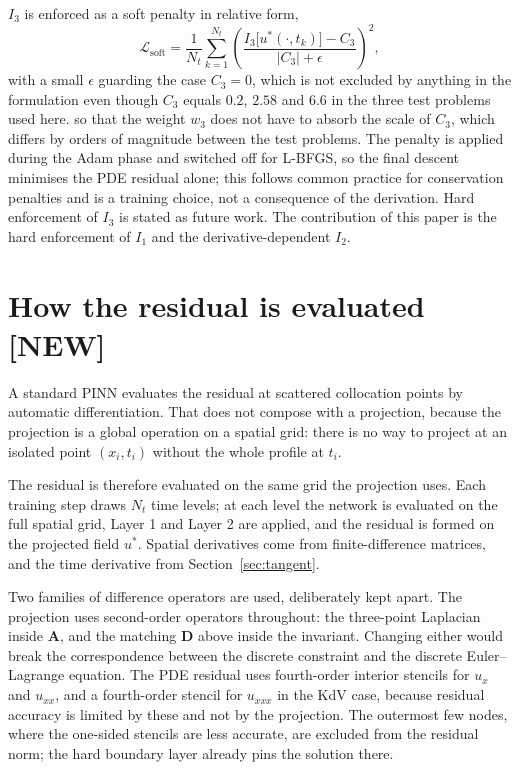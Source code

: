 \documentclass[11pt,a4paper]{article}
\theoremstyle{remark}
\newcommand{\us}{u^{*}}
\begin{document}
$I_3$ is enforced as a soft penalty in relative form,
\begin{equation}
\mathcal{L}_{\text{soft}} = \frac{1}{N_t}\sum_{k=1}^{N_t}
\left(\frac{I_3\big[\us(\cdot,t_k)\big] - C_3}{|C_3| + \epsilon}\right)^{\!2} ,
\end{equation}
with a small $\epsilon$ guarding the case $C_3 = 0$, which is not excluded by
anything in the formulation even though $C_3$ equals $0.2$, $2.58$ and $6.6$ in
the three test problems used here.
so that the weight $w_3$ does not have to absorb the scale of $C_3$, which
differs by orders of magnitude between the test problems. The penalty is
applied during the Adam phase and switched off for L-BFGS, so the final
descent minimises the PDE residual alone; this follows common practice for
conservation penalties and is a training choice, not a consequence of the
derivation. Hard enforcement of $I_3$ is stated as future work. The contribution of this
paper is the hard enforcement of $I_1$ and the derivative-dependent $I_2$.

\section{How the residual is evaluated \textbf{[NEW]}}

A standard PINN evaluates the residual at scattered collocation points by
automatic differentiation. That does not compose with a projection, because
the projection is a global operation on a spatial grid: there is no way to
project at an isolated point $(x_i,t_i)$ without the whole profile at $t_i$.

The residual is therefore evaluated on the same grid the projection uses. Each
training step draws $N_t$ time levels; at each level the network is evaluated
on the full spatial grid, Layer 1 and Layer 2 are applied, and the residual is
formed on the projected field $\us$. Spatial derivatives come from
finite-difference matrices, and the time derivative from
Section~\ref{sec:tangent}.

Two families of difference operators are used, deliberately kept apart. The
projection uses second-order operators throughout: the three-point Laplacian
inside $\bm{A}$, and the matching $\bm{D}$ above inside the invariant. Changing
either would break the correspondence between the discrete constraint and the
discrete Euler--Lagrange equation. The PDE residual uses fourth-order interior
stencils for $u_x$ and $u_{xx}$, and a fourth-order stencil for $u_{xxx}$ in
the KdV case, because residual accuracy is limited by these and not by the
projection. The outermost few nodes, where the one-sided stencils are less
accurate, are excluded from the residual norm; the hard boundary layer already
pins the solution there.
\end{document}

